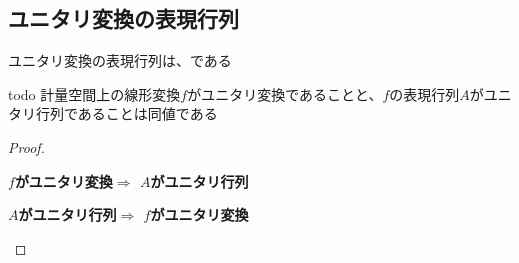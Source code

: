 \documentclass[../../../topic_linear-algebra]{subfiles}
\begin{document}
\subsection{ユニタリ変換の表現行列}

ユニタリ変換の表現行列は、である

\begin{theorem}{todo}
  計量空間上の線形変換$f$がユニタリ変換であることと、$f$の表現行列$A$がユニタリ行列であることは同値である
\end{theorem}

\begin{proof}
  \begin{subpattern}{\bfseries $f$がユニタリ変換$\Longrightarrow$ $A$がユニタリ行列}

  \end{subpattern}

  \begin{subpattern}{\bfseries $A$がユニタリ行列$\Longrightarrow$ $f$がユニタリ変換}

  \end{subpattern}
\end{proof}
\end{document}
